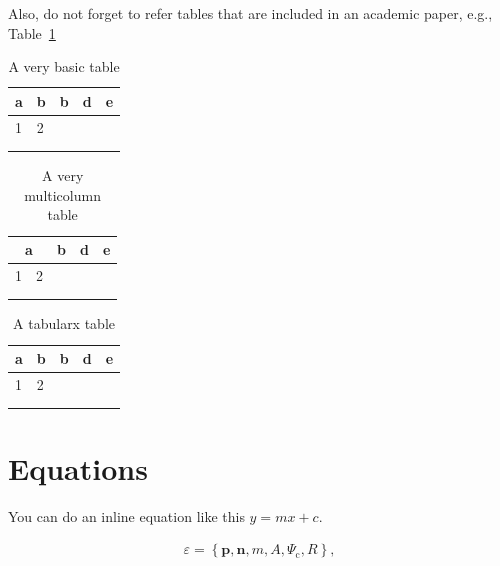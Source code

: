 \documentclass[conference, a4paper]{IEEEtran}
\begin{document}
Also, do not forget to refer tables that are included in an academic paper, e.g., Table~\ref{tab:basic}

\begin{table}[]
\centering
\caption{A very basic table}
\label{tab:basic}
\begin{tabular}{|l|l|l|l|l|}
\hline
a & b & b & d & e \\ \hline
1 & 2 &   &   &   \\ \hline
  &   &   &   &   \\ \hline
  &   &   &   &   \\ \hline
\end{tabular}
\end{table}

\begin{table}[]
\centering
\caption{A very multicolumn table}
\label{tab:multicolumn}
\begin{tabular}{|ll|l|l|l|}
\hline
\multicolumn{2}{|c|}{a}     & b & d & e \\ \hline
\multicolumn{1}{|l|}{1} & 2 &   &   &   \\ \hline
\multicolumn{1}{|l|}{}  &   &   &   &   \\ \hline
\multicolumn{1}{|l|}{}  &   &   &   &   \\ \hline
\end{tabular}
\end{table}

\begin{table}[]
\centering
\caption{A tabularx table}
\label{tab:tabularx}
\begin{tabularx}{\columnwidth}{|X|l|l|l|l|}
\hline
a & b & b & d & e \\ \hline
1 & 2 &   &   &   \\ \hline
  &   &   &   &   \\ \hline
  &   &   &   &   \\ \hline
\end{tabularx}
\end{table}


\section{Equations}
\label{sec:eq}

You can do an inline equation like this $y = mx + c$.

    \begin{align}\label{eq:elementalobject}
      \varepsilon = \left\{ \mathbf{p}, \mathbf{n}, m, A, \Psi_\text{c}, R \right\},
    \end{align}
    
\end{document}
